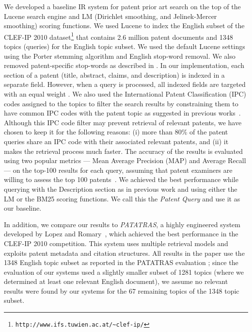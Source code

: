 We developed a baseline IR system for patent prior art search on the top of
the Lucene search engine
and LM (Dirichlet
smoothing, and Jelinek-Mercer smoothing)
scoring functions. %
We used Lucene to index the English subset of the CLEF-IP 2010 dataset\footnote{\texttt{http://www.ifs.tuwien.ac.at/\textasciitilde{}clef-ip/}} 
that contains 2.6 million patent documents and 1348 topics (queries) for the English topic subset.
We used the default Lucene settings using the Porter stemming algorithm 
and English stop-word removal. 
We also removed patent-specific stop-words as described in \cite{magdy2012toward}.
In
our implementation, each section of a patent (title, abstract, claims,
and description) is indexed in a separate field. However, when a query 
is processed, all indexed fields are targeted with an equal weight \cite{Bouadjenek2015}.
% 
We also used the International
Patent Classification (IPC) codes assigned to the topics to filter
the search results by constraining them to have common IPC codes with
the patent topic as suggested in previous works~\cite{lopez2010experiments}.
Although this IPC code filter may prevent retrieval of relevant patents, we
have chosen to keep it for the following reasons: (i) more than 80\%
of the patent queries share an IPC code with their associated relevant
patents, and (ii) it makes the retrieval process much faster. The accuracy of the results is evaluated using two popular metrics --- Mean Average Precision (MAP) and Average Recall --- on the top-100 results for each query, assuming that patent examiners are willing to assess the top 100 patents~\cite{joho2010survey}. 
We achieved the best performance while querying with the Description
section as in previous work \cite{xue2009transforming} and using
either the LM or the BM25 scoring functions. We call this 
the \textit{Patent Query} and use it as our baseline.

In addition, we compare our results to \textit{PATATRAS}, a highly engineered system developed by Lopez and Romary~\cite{lopez2010experiments}, 
which achieved the best performance in the CLEF-IP 2010 competition. This system uses multiple retrieval models %
and exploits patent metadata and citation structures.  All results in the paper use the 1348 English topic subset as reported in the PATATRAS evaluation \cite{piroi2010clef}; since the evaluation of our systems used a slightly smaller subset of 1281 topics (where we determined at least one relevant English document), we assume no relevant results were found by our systems for the 67 remaining topics of the 1348 topic subset.

